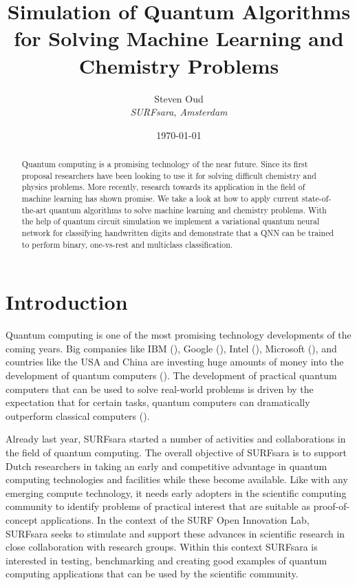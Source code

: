 \documentclass[a4paper,10pt]{article}
\title{Simulation of Quantum Algorithms for Solving Machine Learning and Chemistry Problems}
\author{Steven Oud \\ \emph{SURFsara, Amsterdam}}
\date{\today}
\begin{document}
\maketitle

\begin{abstract}
Quantum computing is a promising technology of the near future.
Since its first proposal researchers have been looking to use it for solving difficult chemistry and physics problems.
More recently, research towards its application in the field of machine learning has shown promise.
We take a look at how to apply current state-of-the-art quantum algorithms to solve machine learning and chemistry problems.
With the help of quantum circuit simulation we implement a variational quantum neural network for classifying handwritten digits and demonstrate that a QNN can be trained to perform binary, one-vs-rest and multiclass classification.
\end{abstract}

\tableofcontents

\section{Introduction}
Quantum computing is one of the most promising technology developments of the coming years.
Big companies like IBM (\cite{ibm-quantum}), Google (\cite{google-quantum}), Intel (\cite{intel-quantum}), Microsoft (\cite{microsoft-quantum}), and countries like the USA and China are investing huge amounts of money into the development of quantum computers (\cite{usa-quantum, china-quantum}).
The development of practical quantum computers that can be used to solve real-world problems is driven by the expectation that for certain tasks, quantum computers can dramatically outperform classical computers (\cite{preskill-qc}).

Already last year, SURFsara started a number of activities and collaborations in the field of quantum computing.
The overall objective of SURFsara is to support Dutch researchers in taking an early and competitive advantage in quantum computing technologies and facilities while these become available.
Like with any emerging compute technology, it needs early adopters in the scientific computing community to identify problems of practical interest that are suitable as proof-of-concept applications.
In the context of the SURF Open Innovation Lab, SURFsara seeks to stimulate and support these advances in scientific research in close collaboration with research groups.
Within this context SURFsara is interested in testing, benchmarking and creating good examples of quantum computing applications that can be used by the scientific community.
\end{document}
